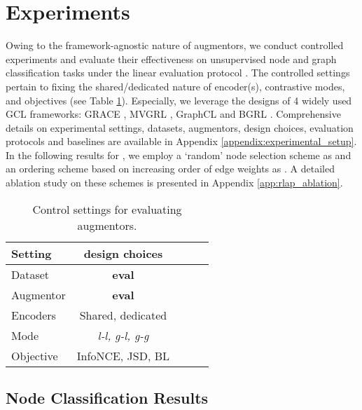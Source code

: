 \documentclass{article}
\theoremstyle{plain}
\theoremstyle{definition}
\theoremstyle{remark}
\begin{document}
\section{Experiments}

Owing to the framework-agnostic nature of augmentors, we conduct controlled experiments and evaluate their effectiveness on unsupervised node and graph classification tasks under the linear evaluation protocol \citep{velickovic2019deep}. The controlled settings pertain to fixing the shared/dedicated nature of encoder(s), contrastive modes, and objectives (see Table \ref{table:exp_settings}). Especially, we leverage the designs of 4 widely used GCL frameworks: GRACE \citep{zhu2020deep}, MVGRL \citep{hassani2020contrastive}, GraphCL \citep{you2020graph} and BGRL \citep{thakoor2021bootstrapped}. Comprehensive details on experimental settings, datasets, augmentors, design choices, evaluation protocols  and baselines are available in Appendix \ref{appendix:experimental_setup}. In the following results for , we employ a `random' node selection scheme as  and an ordering scheme based on increasing order of edge weights as . A detailed ablation study on these schemes is presented in Appendix \ref{app:rlap_ablation}.

\begin{table}[ht]
\caption{Control settings for evaluating augmentors.}
\label{table:exp_settings}
\vskip 0.15in
\begin{center}
\begin{small}
\begin{sc}
\begin{tabular}{lcccr}
\toprule
Setting & design choices\\
\midrule
Dataset     & \textbf{eval} \\
Augmentor   & \textbf{eval} \\
Encoders    &  Shared, dedicated \\
Mode    & \textit{l-l, g-l, g-g} \\
Objective   & InfoNCE, JSD, BL\\
\bottomrule
\end{tabular}
\end{sc}
\end{small}
\end{center}
\vskip -0.1in
\end{table}

\subsection{Node Classification Results}
\end{document}
